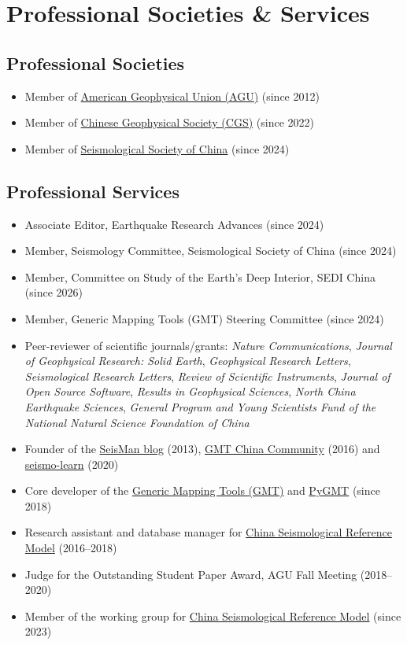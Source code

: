 \section{Professional Societies \& Services}

\subsection{Professional Societies}
\begin{itemize}
\item Member of \href{https://sites.agu.org/}{American Geophysical Union (AGU)} (since 2012)
\item Member of \href{http://www.cgscgs.org.cn/}{Chinese Geophysical Society (CGS)} (since 2022)
\item Member of \href{https://www.ssoc.org.cn/}{Seismological Society of China} (since 2024)
\end{itemize}

\subsection{Professional Services}
\begin{itemize}
\item Associate Editor, Earthquake Research Advances (since 2024)
\item Member, Seismology Committee, Seismological Society of China (since 2024)
\item Member, Committee on Study of the Earth's Deep Interior, SEDI China (since 2026)
\item Member, Generic Mapping Tools (GMT) Steering Committee (since 2024)
\item Peer-reviewer of scientific journals/grants:
      \emph{Nature Communications},
      \emph{Journal of Geophysical Research: Solid Earth},
      \emph{Geophysical Research Letters},
      \emph{Seismological Research Letters},
      \emph{Review of Scientific Instruments},
      \emph{Journal of Open Source Software},
      \emph{Results in Geophysical Sciences},
      \emph{North China Earthquake Sciences},
      \emph{General Program and Young Scientists Fund of the National Natural Science Foundation of China}
\item Founder of the \href{https://blog.seisman.info}{SeisMan blog} (2013),
      \href{http://gmt-china.org/}{GMT China Community} (2016)
      and \href{https://seismo-learn.org/}{seismo-learn} (2020)
\item Core developer of the \href{https://github.com/GenericMappingTools/gmt}{Generic Mapping Tools (GMT)} and
      \href{https://github.com/GenericMappingTools/pygmt}{PyGMT} (since 2018)
\item Research assistant and database manager for \href{http://chinageorefmodel.org/}{China Seismological Reference Model} (2016--2018)
\item Judge for the Outstanding Student Paper Award, AGU Fall Meeting (2018--2020)
\item Member of the working group for \href{http://chinageorefmodel.org/}{China Seismological Reference Model} (since 2023)
\end{itemize}

